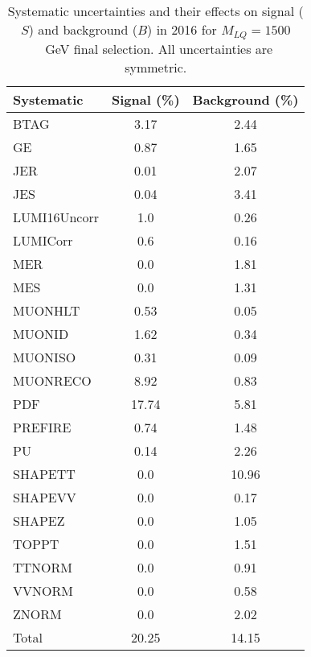 \begin{table}[htbp]
\begin{center}
\caption{Systematic uncertainties and their effects on signal ($S$) and background ($B$) in 2016 for $M_{LQ}=1500$~GeV final selection. All uncertainties are symmetric.}
\begin{tabular}{lcc}
\hline\hline
Systematic & Signal (\%) & Background (\%) \\ \hline 
BTAG & 3.17 & 2.44\\ 
GE & 0.87 & 1.65\\ 
JER & 0.01 & 2.07\\ 
JES & 0.04 & 3.41\\ 
LUMI16Uncorr & 1.0 & 0.26\\ 
LUMICorr & 0.6 & 0.16\\ 
MER & 0.0 & 1.81\\ 
MES & 0.0 & 1.31\\ 
MUONHLT & 0.53 & 0.05\\ 
MUONID & 1.62 & 0.34\\ 
MUONISO & 0.31 & 0.09\\ 
MUONRECO & 8.92 & 0.83\\ 
PDF & 17.74 & 5.81\\ 
PREFIRE & 0.74 & 1.48\\ 
PU & 0.14 & 2.26\\ 
SHAPETT & 0.0 & 10.96\\ 
SHAPEVV & 0.0 & 0.17\\ 
SHAPEZ & 0.0 & 1.05\\ 
TOPPT & 0.0 & 1.51\\ 
TTNORM & 0.0 & 0.91\\ 
VVNORM & 0.0 & 0.58\\ 
ZNORM & 0.0 & 2.02\\ 
Total & 20.25 & 14.15\\ \hline \hline
\end{tabular}
\label{tab:SysUncertainties_uujj_1500}
\end{center}
\end{table}

